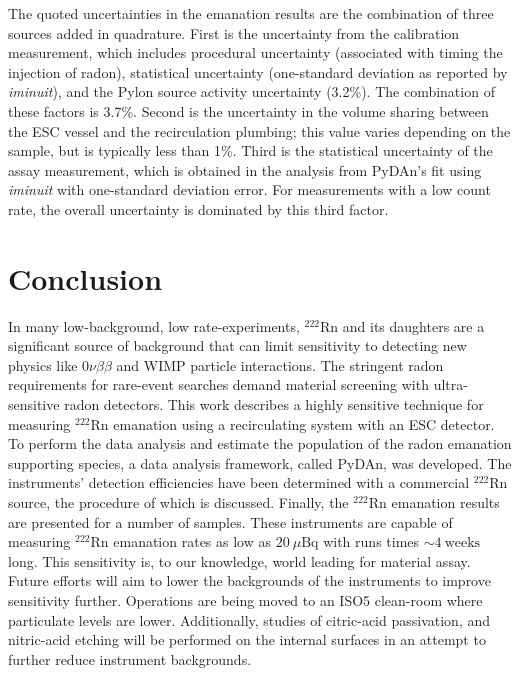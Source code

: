 \documentclass[final,3p,times]{elsarticle}
\begin{document}
The quoted uncertainties in the emanation results are the combination of three sources added in quadrature. 
First is the uncertainty from the calibration measurement, which includes procedural uncertainty (associated with timing the injection of radon), statistical uncertainty (one-standard deviation as reported by \textit{iminuit}), and the Pylon source activity uncertainty (3.2\%). The combination of these factors is 3.7\%.
Second is the uncertainty in the volume sharing between the ESC vessel and the recirculation plumbing; this value varies depending on the sample, but is typically less than 1\%. 
Third is the statistical uncertainty of the assay measurement, which is obtained in the analysis from PyDAn's fit using \textit{iminuit} with one-standard deviation error.
For measurements with a low count rate, the overall uncertainty is dominated by this third factor. 


\section{Conclusion}
In many low-background, low rate-experiments, $^{222}\text{Rn}$ and its daughters are a significant source of background that can limit sensitivity to detecting new physics like $0\nu\beta\beta$ and WIMP particle interactions.
The stringent radon requirements for rare-event searches demand material screening with ultra-sensitive radon detectors. 
This work describes a highly sensitive technique for measuring $^{222}\text{Rn}$ emanation using a recirculating system with an ESC detector. 
To perform the data analysis and estimate the population of the radon emanation supporting species, a data analysis framework, called PyDAn, was developed.
The instruments' detection efficiencies have been determined with a commercial $^{222}\text{Rn}$ source, the procedure of which is discussed. 
Finally, the $^{222}\text{Rn}$ emanation results are presented for a number of samples. 
These instruments are capable of measuring $^{222}\text{Rn}$ emanation rates as low as $20~\text{$\mu$Bq}$ with runs times $\sim 4~\mathrm{weeks}$ long.
This sensitivity is, to our knowledge, world leading for material assay.
Future efforts will aim to lower the backgrounds of the instruments to improve sensitivity further.
Operations are being moved to an ISO5 clean-room where particulate levels are lower.
Additionally, studies of citric-acid passivation, and nitric-acid etching will be performed on the internal surfaces in an attempt to further reduce instrument backgrounds. 
\end{document}
